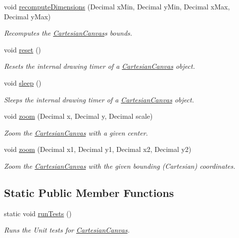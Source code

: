 \begin{DoxyCompactItemize}
void \hyperlink{classtsgl_1_1_cartesian_canvas_ac833a44fe7367f6411292707de37beef}{recompute\+Dimensions} (Decimal x\+Min, Decimal y\+Min, Decimal x\+Max, Decimal y\+Max)
\begin{DoxyCompactList}\small\item\em Recomputes the \hyperlink{classtsgl_1_1_cartesian_canvas}{Cartesian\+Canvas}\textquotesingle{}s bounds. \end{DoxyCompactList}\item 
void \hyperlink{classtsgl_1_1_cartesian_canvas_a735ebb290eb1be110b3f7bb033018a21}{reset} ()
\begin{DoxyCompactList}\small\item\em Resets the internal drawing timer of a \hyperlink{classtsgl_1_1_cartesian_canvas}{Cartesian\+Canvas} object. \end{DoxyCompactList}\item 
void \hyperlink{classtsgl_1_1_cartesian_canvas_a3ae99570b9a5f68f4ccf31593867edb0}{sleep} ()
\begin{DoxyCompactList}\small\item\em Sleeps the internal drawing timer of a \hyperlink{classtsgl_1_1_cartesian_canvas}{Cartesian\+Canvas} object. \end{DoxyCompactList}\item 
void \hyperlink{classtsgl_1_1_cartesian_canvas_a69a378f61868c4c880889c33ec33c992}{zoom} (Decimal x, Decimal y, Decimal scale)
\begin{DoxyCompactList}\small\item\em Zoom the \hyperlink{classtsgl_1_1_cartesian_canvas}{Cartesian\+Canvas} with a given center. \end{DoxyCompactList}\item 
void \hyperlink{classtsgl_1_1_cartesian_canvas_adb1e999087c0ec7e4405d8ebd3ca9760}{zoom} (Decimal x1, Decimal y1, Decimal x2, Decimal y2)
\begin{DoxyCompactList}\small\item\em Zoom the \hyperlink{classtsgl_1_1_cartesian_canvas}{Cartesian\+Canvas} with the given bounding (Cartesian) coordinates. \end{DoxyCompactList}\end{DoxyCompactItemize}
\subsection*{Static Public Member Functions}
\begin{DoxyCompactItemize}
\item 
\hypertarget{classtsgl_1_1_cartesian_canvas_ae40d704629167ff70303a3c55ee3bb43}{}static void \hyperlink{classtsgl_1_1_cartesian_canvas_ae40d704629167ff70303a3c55ee3bb43}{run\+Tests} ()\label{classtsgl_1_1_cartesian_canvas_ae40d704629167ff70303a3c55ee3bb43}

\begin{DoxyCompactList}\small\item\em Runs the Unit tests for \hyperlink{classtsgl_1_1_cartesian_canvas}{Cartesian\+Canvas}. \end{DoxyCompactList}\end{DoxyCompactItemize}
